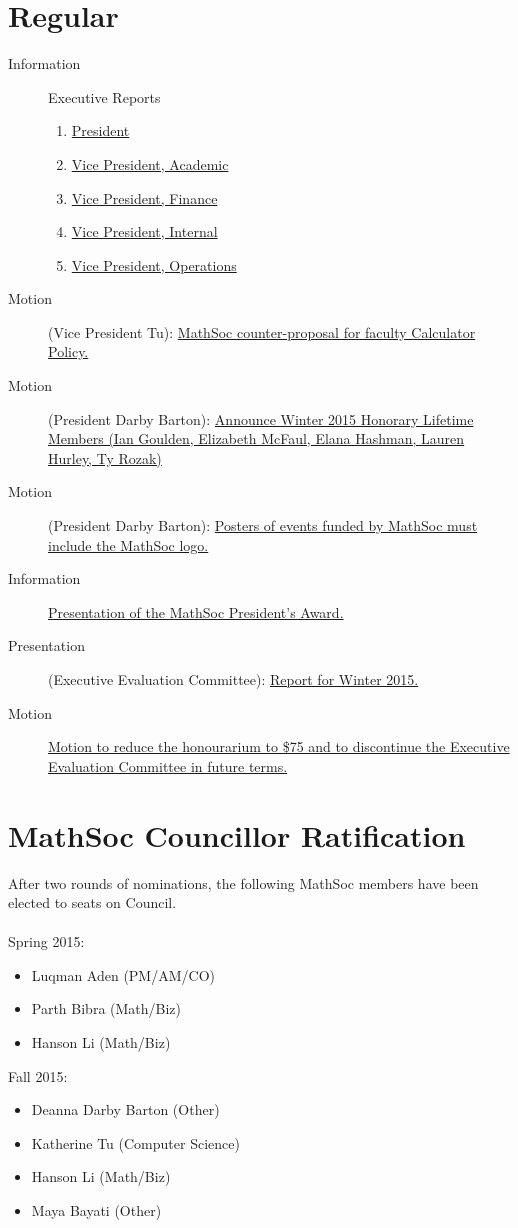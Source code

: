 \documentclass[12pt, letterpaper]{article}
\begin{document}
\section*{Regular}
\begin{description}
	\item[Information] Executive Reports
	\begin{enumerate}
		\item \hyperref[president]{President}
		\item \hyperref[vpacademic]{Vice President, Academic}
		\item \hyperref[vpfinance]{Vice President, Finance}
		\item \hyperref[vpinternal]{Vice President, Internal}
		\item \hyperref[vpoperations]{Vice President, Operations}
	\end{enumerate}
	\item[Motion] (Vice President Tu): \hyperref[calc]{MathSoc counter-proposal for faculty Calculator Policy.}
	\item[Motion] (President Darby Barton): \hyperref[hlm]{Announce Winter 2015 Honorary Lifetime Members (Ian Goulden, Elizabeth McFaul, Elana Hashman, Lauren Hurley, Ty Rozak)}
	\item[Motion] (President Darby Barton): \hyperref[clubs]{Posters of events funded by MathSoc must include the MathSoc logo.}
	\item[Information] \hyperref[award]{Presentation of the MathSoc President's Award.}
	\item[Presentation] (Executive Evaluation Committee): \hyperref[eec]{Report for Winter 2015.}
	\item[Motion] \hyperref[honour]{Motion to reduce the honourarium to \$75 and to discontinue the Executive Evaluation Committee in future terms.}
\end{description}
\HRule

\newpage


\newpage
{}
\section*{MathSoc Councillor Ratification}
After two rounds of nominations, the following MathSoc members have been elected to seats on Council.\\\\
Spring 2015:
\begin{itemize}
	\item Luqman Aden (PM/AM/CO)
	\item Parth Bibra (Math/Biz)
	\item Hanson Li (Math/Biz)
\end{itemize}
Fall 2015:
\begin{itemize}
	\item Deanna Darby Barton (Other)
	\item Katherine Tu (Computer Science)
	\item Hanson Li (Math/Biz)
	\item Maya Bayati (Other)
\end{itemize}
\end{document}
